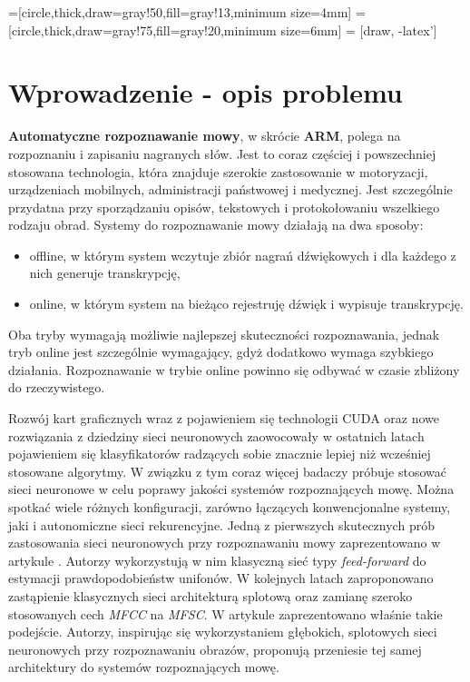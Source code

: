 \documentclass[shortabstract, mgr]{iithesis}
\author{Aleksander Sas}
\begin{document}
=[circle,thick,draw=gray!50,fill=gray!13,minimum size=4mm]
=[circle,thick,draw=gray!75,fill=gray!20,minimum size=6mm]
 = [draw, -latex']


\chapter{Wprowadzenie - opis problemu}
	\textbf{Automatyczne rozpoznawanie mowy}, w skrócie \textbf{ARM}, polega na rozpoznaniu i zapisaniu nagranych słów. Jest to coraz częściej i powszechniej stosowana technologia, która znajduje szerokie zastosowanie w motoryzacji, urządzeniach mobilnych, administracji państwowej i medycznej. Jest szczególnie przydatna przy sporządzaniu opisów, tekstowych i protokołowaniu wszelkiego rodzaju obrad. Systemy do rozpoznawanie mowy działają na dwa sposoby:
	\begin{itemize}
		\item offline, w którym system wczytuje zbiór nagrań dźwiękowych i dla każdego z nich generuje transkrypcję,
		\item online, w którym system na bieżąco rejestruję dźwięk i wypisuje transkrypcję.
	\end{itemize}
	Oba tryby wymagają możliwie najlepszej skuteczności rozpoznawania, jednak tryb online jest szczególnie wymagający, gdyż dodatkowo wymaga szybkiego działania. Rozpoznawanie w trybie online powinno się odbywać w czasie zbliżony do rzeczywistego. 
	
	Rozwój kart graficznych wraz z pojawieniem się technologii CUDA oraz nowe rozwiązania z dziedziny sieci neuronowych zaowocowały w ostatnich latach pojawieniem się klasyfikatorów radzących sobie znacznie lepiej niż wcześniej stosowane algorytmy. W związku z tym coraz więcej badaczy próbuje stosować sieci neuronowe w celu poprawy jakości systemów rozpoznających mowę. Można spotkać wiele różnych konfiguracji, zarówno łączących konwencjonalne systemy, jaki i autonomiczne sieci rekurencyjne.
	Jedną z pierwszych skutecznych prób zastosowania sieci neuronowych przy rozpoznawaniu mowy zaprezentowano w artykule \cite{NN_ASR_monophones}. Autorzy wykorzystują w nim klasyczną sieć typy \textit{feed-forward} do estymacji prawdopodobieństw unifonów. W kolejnych latach zaproponowano zastąpienie klasycznych sieci architekturą splotową oraz zamianę szeroko stosowanych cech \textit{MFCC} na \textit{MFSC}. W artykule \cite{article1} zaprezentowano właśnie takie podejście. Autorzy, inspirując się wykorzystaniem głębokich, splotowych sieci neuronowych przy rozpoznawaniu obrazów, proponują przeniesie tej samej architektury do systemów rozpoznających mowę.
	
\end{document}
